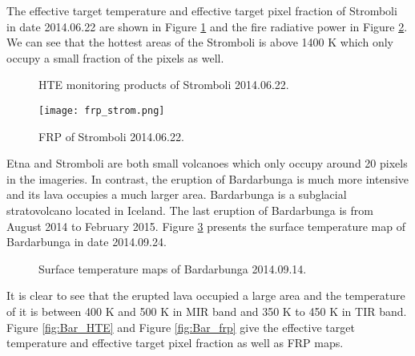 \noindent The effective target temperature and effective target pixel fraction of Stromboli in date 2014.06.22 are shown in Figure \ref{fig:Strom_HTE} and the fire radiative power in Figure \ref{fig:Strom_frp}. We can see that the hottest areas of the Stromboli is above 1400 K which only occupy a small fraction of the pixels as well.\\

\begin{figure}[!htbp]
\centering
{}
\hspace{0.1in}
\caption{HTE monitoring products of Stromboli 2014.06.22.}
\label{fig:Strom_HTE}
\end{figure}

\begin{figure}[!htbp]
\centering
\texttt{[image: frp\_strom.png]}
\caption{FRP of Stromboli 2014.06.22.}
\label{fig:Strom_frp}
\end{figure}

\noindent Etna and Stromboli are both small volcanoes which only occupy around 20 pixels in the imageries. In contrast, the eruption of Bardarbunga is much more intensive and its lava occupies a much larger area. Bardarbunga is a subglacial stratovolcano located in Iceland. The last eruption of Bardarbunga is from August 2014 to February 2015. Figure \ref{fig:Bar_sur_tem} presents the surface temperature map of Bardarbunga in date 2014.09.24.\\

\begin{figure}
\centering
{}
\hspace{0.1in}
\caption{Surface temperature maps of Bardarbunga 2014.09.14.}
\label{fig:Bar_sur_tem}
\end{figure}

\noindent It is clear to see that the erupted lava occupied a large area and the temperature of it is between 400 K and 500 K in MIR band and 350 K to 450 K in TIR band. Figure \ref{fig:Bar_HTE} and Figure \ref{fig:Bar_frp} give the effective target temperature and effective target pixel fraction as well as FRP maps.\

